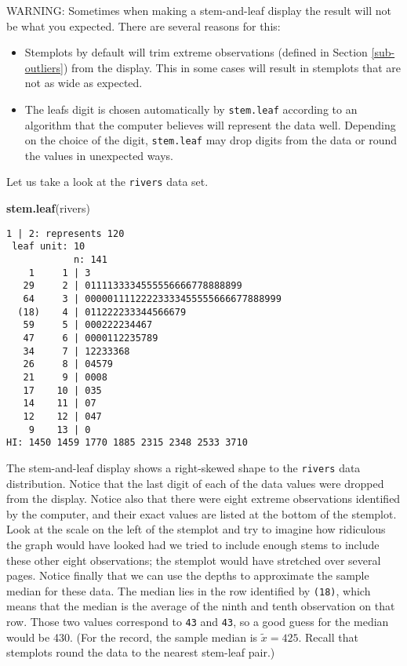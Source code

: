 \documentclass[]{book}
\newenvironment{Shaded}{\begin{snugshade}}{\end{snugshade}}
\newcommand{\KeywordTok}[1]{\textcolor[rgb]{0.13,0.29,0.53}{\textbf{{#1}}}}
\newcommand{\NormalTok}[1]{{#1}}
\providecommand{\tightlist}{%
  \setlength{\itemsep}{0pt}\setlength{\parskip}{0pt}}
\numberwithin{equation}{chapter}
\numberwithin{figure}{chapter}
\theoremstyle{plain}
\theoremstyle{definition}
\theoremstyle{remark}
\theoremstyle{definition}
\theoremstyle{definition}
\theoremstyle{remark}
\begin{document}
WARNING: Sometimes when making a stem-and-leaf display the result will
not be what you expected. There are several reasons for this:

\begin{itemize}
\tightlist
\item
  Stemplots by default will trim extreme observations (defined in
  Section \ref{sub-outliers}) from the display. This in some cases will
  result in stemplots that are not as wide as expected.
\item
  The leafs digit is chosen automatically by \texttt{stem.leaf}
  according to an algorithm that the computer believes will represent
  the data well. Depending on the choice of the digit,
  \texttt{stem.leaf} may drop digits from the data or round the values
  in unexpected ways.
\end{itemize}

Let us take a look at the \texttt{rivers} data set.

\begin{Shaded}
\begin{Highlighting}[]
\KeywordTok{stem.leaf}\NormalTok{(rivers)}
\end{Highlighting}
\end{Shaded}

\begin{verbatim}
1 | 2: represents 120
 leaf unit: 10
            n: 141
    1     1 | 3
   29     2 | 0111133334555556666778888899
   64     3 | 00000111122223333455555666677888999
  (18)    4 | 011222233344566679
   59     5 | 000222234467
   47     6 | 0000112235789
   34     7 | 12233368
   26     8 | 04579
   21     9 | 0008
   17    10 | 035
   14    11 | 07
   12    12 | 047
    9    13 | 0
HI: 1450 1459 1770 1885 2315 2348 2533 3710
\end{verbatim}

The stem-and-leaf display shows a right-skewed shape to the
\texttt{rivers} data distribution. Notice that the last digit of each of
the data values were dropped from the display. Notice also that there
were eight extreme observations identified by the computer, and their
exact values are listed at the bottom of the stemplot. Look at the scale
on the left of the stemplot and try to imagine how ridiculous the graph
would have looked had we tried to include enough stems to include these
other eight observations; the stemplot would have stretched over several
pages. Notice finally that we can use the depths to approximate the
sample median for these data. The median lies in the row identified by
\texttt{(18)}, which means that the median is the average of the ninth
and tenth observation on that row. Those two values correspond to
\texttt{43} and \texttt{43}, so a good guess for the median would be
430. (For the record, the sample median is \(\widetilde{x}=425\). Recall
that stemplots round the data to the nearest stem-leaf pair.)
\end{document}
